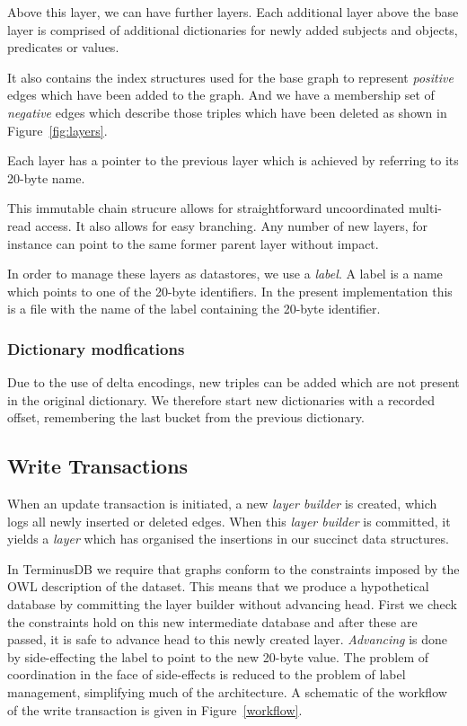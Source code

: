 \documentclass[10pt, a4paper, twocolumn]{article} %
\begin{document}
Above this layer, we can have further layers. Each additional layer
above the base layer is comprised of additional dictionaries for newly
added subjects and objects, predicates or values.

It also contains the index structures used for the base graph to
represent {\em positive} edges which have been added to the graph. And
we have a membership set of {\em negative} edges which describe those
triples which have been deleted as shown in Figure~\ref{fig:layers}.

Each layer has a pointer to the previous layer which is achieved by
referring to its 20-byte name.

This immutable chain strucure allows for straightforward uncoordinated
multi-read access.  It also allows for easy branching. Any number of
new layers, for instance can point to the same former parent layer
without impact.

In order to manage these layers as datastores, we use a {\em label}. A
label is a name which points to one of the 20-byte identifiers. In the
present implementation this is a file with the name of the label
containing the 20-byte identifier.

\subsubsection{Dictionary modfications}

Due to the use of delta encodings, new triples can be added which are
not present in the original dictionary. We therefore start new
dictionaries with a recorded offset, remembering the last bucket from
the previous dictionary.

\subsection{Write Transactions}

When an update transaction is initiated, a new {\em layer builder} is
created, which logs all newly inserted or deleted edges. When this
{\em layer builder} is committed, it yields a {\em layer} which has
organised the insertions in our succinct data structures.

In TerminusDB we require that graphs conform to the constraints
imposed by the OWL description of the dataset. This means that we
produce a hypothetical database by committing the layer builder
without advancing head. First we check the constraints hold on this
new intermediate database and after these are passed, it is safe to
advance head to this newly created layer. {\em Advancing} is done by
side-effecting the label to point to the new 20-byte value. The
problem of coordination in the face of side-effects is reduced to the
problem of label management, simplifying much of the architecture. A
schematic of the workflow of the write transaction is given in
Figure~\ref{workflow}.
\end{document}
